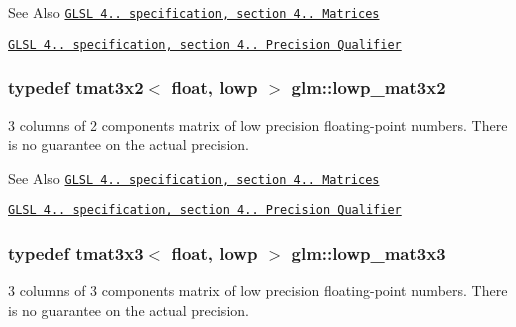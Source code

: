 \begin{DoxySeeAlso}{See Also}
\href{http://www.opengl.org/registry/doc/GLSLangSpec.4.20.8.pdf}{\tt G\-L\-S\-L 4.. specification, section 4.. Matrices} 

\href{http://www.opengl.org/registry/doc/GLSLangSpec.4.20.8.pdf}{\tt G\-L\-S\-L 4.. specification, section 4.. Precision Qualifier} 
\end{DoxySeeAlso}
\hypertarget{group__core__precision_ga8db0631a52908b3b4805b6abeda26176}{
\subsubsection[{lowp\-\_\-mat3x2}]{\setlength{\rightskip}{0pt plus 5cm}typedef tmat3x2$<$ float, lowp $>$ {\bf glm\-::lowp\-\_\-mat3x2}}}\label{group__core__precision_ga8db0631a52908b3b4805b6abeda26176}
3 columns of 2 components matrix of low precision floating-\/point numbers. There is no guarantee on the actual precision.

\begin{DoxySeeAlso}{See Also}
\href{http://www.opengl.org/registry/doc/GLSLangSpec.4.20.8.pdf}{\tt G\-L\-S\-L 4.. specification, section 4.. Matrices} 

\href{http://www.opengl.org/registry/doc/GLSLangSpec.4.20.8.pdf}{\tt G\-L\-S\-L 4.. specification, section 4.. Precision Qualifier} 
\end{DoxySeeAlso}
\hypertarget{group__core__precision_ga8d591be4ef2bf3bbcd7473c3eadeaf55}{
\subsubsection[{lowp\-\_\-mat3x3}]{\setlength{\rightskip}{0pt plus 5cm}typedef tmat3x3$<$ float, lowp $>$ {\bf glm\-::lowp\-\_\-mat3x3}}}\label{group__core__precision_ga8d591be4ef2bf3bbcd7473c3eadeaf55}
3 columns of 3 components matrix of low precision floating-\/point numbers. There is no guarantee on the actual precision.

